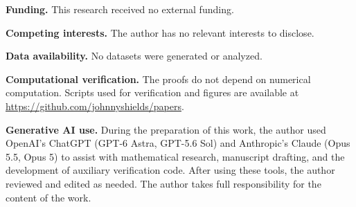 \documentclass[11pt,a4paper]{amsart}
\numberwithin{equation}{section}
\theoremstyle{plain}
\theoremstyle{definition}
\begin{document}
{\footnotesize
\noindent\textbf{Funding.} This research received no external funding.

\smallskip
\noindent\textbf{Competing interests.} The author has no relevant interests to disclose.

\smallskip
\noindent\textbf{Data availability.} No datasets were generated or analyzed.

\smallskip
\noindent\textbf{Computational verification.} The proofs do not depend on numerical computation.  Scripts used for verification and figures are available at \url{https://github.com/johnnyshields/papers}.

\smallskip
\noindent\textbf{Generative AI use.} During the preparation of this work, the author used OpenAI's ChatGPT (GPT-6 Astra, GPT-5.6 Sol) and Anthropic's Claude (Opus 5.5, Opus 5) to assist with mathematical research, manuscript drafting, and the development of auxiliary verification code.  After using these tools, the author reviewed and edited as needed.  The author takes full responsibility for the content of the work.
\par}
\end{document}
